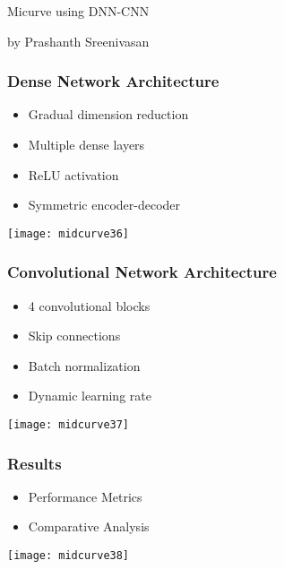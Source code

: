 \begin{frame}[fragile]\frametitle{}
\begin{center}
{\Large Micurve using DNN-CNN}

{by Prashanth Sreenivasan}
\end{center}
\end{frame}

\begin{frame}[fragile]\frametitle{Dense Network Architecture}

	\begin{itemize}
	\item Gradual dimension reduction
	\item Multiple dense layers
	\item ReLU activation
	\item Symmetric encoder-decoder 
	\end{itemize}

\begin{center}
\texttt{[image: midcurve36]}
\end{center}	
\end{frame}

\begin{frame}[fragile]\frametitle{Convolutional Network Architecture}

	\begin{itemize}
	\item 4 convolutional blocks
	\item Skip connections
	\item Batch normalization
	\item Dynamic learning rate 
	\end{itemize}

\begin{center}
\texttt{[image: midcurve37]}
\end{center}	
\end{frame}

\begin{frame}[fragile]\frametitle{Results}

	\begin{itemize}
	\item Performance Metrics
	\item Comparative Analysis
	\end{itemize}

\begin{center}
\texttt{[image: midcurve38]}
\end{center}	
\end{frame}

